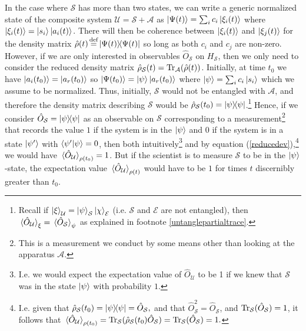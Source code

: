     In the case where $\mathcal{S}$ has more than two states, we can write a generic normalized state of the composite system $\mathcal{U}=\mathcal{S}+\mathcal{A}$  as $\ket{\Psi(t)}=\sum_i c_i\ket{\xi_i(t)}$  where $\ket{\xi_i(t)}=\ket{s_i}\ket{a_i(t)}$. There will then be coherence between $\ket{\xi_i(t)}$ and $\ket{\xi_j(t)}$ for the density matrix $\hat{\rho}(t)\myeq\dyad{\Psi(t)}$ so long as both $c_i$ and $c_j$ are non-zero. However, if we are only interested in observables $\hat{O}_\mathcal{S}$ on $H_\mathcal{S}$, then we only need to consider the reduced density matrix $\hat{\rho}_\mathcal{S}(t)=\operatorname{Tr}_\mathcal{A}(\hat{\rho}(t))$. Initially, at time $t_0$ we have $\ket{a_i(t_0)}=\ket{a_r(t_0)}$ so $\ket{\Psi(t_0)}=\ket{\psi}\ket{a_r(t_0)}$ where $\ket{\psi}=\sum_i c_i\ket{s_i}$ which we assume to be normalized. Thus, initially, $\mathcal{S}$ would not be entangled with $\mathcal{A}$, and therefore the density matrix describing $\mathcal{S}$ would be $\hat{\rho}_\mathcal{S}(t_0)=\dyad{\psi}$.\footnote{Recall if $\ket{\xi}_\mathcal{U}=\ket{\psi}_\mathcal{S}\ket{\chi}_\mathcal{E}$ (i.e. $\mathcal{S}$ and $\mathcal{E}$ are not entangled), then $\ev*{\hat{O}_\mathcal{U}}_\xi=\ev*{\hat{O}_\mathcal{S}}_\psi$ as explained in footnote \ref{untanglepartialtrace}.} Hence, if we consider $\hat{O}_\mathcal{S}=\dyad{\psi}$ as an observable on $\mathcal{S}$ corresponding to a measurement\footnote{This is a measurement we conduct by some means other than looking at the apparatus $\mathcal{A}$.} that records the value $1$ if the system is in the $\ket{\psi}$ and $0$ if the system is in a state $\ket{\psi'}$ with $\ip{\psi'}{\psi}=0$, then both intuitively\footnote{I.e. we would expect the expectation value of $\hat{O}_\mathcal{U}$ to be 1 if we knew that $\mathcal{S}$ was in the state $\ket{\psi}$ with probability $1$. } and by equation (\ref{reducedev}),\footnote{I.e. given that $\hat{\rho}_\mathcal{S}(t_0)=\dyad{\psi}=\hat{O}_\mathcal{S},$ and that $\hat{O}_\mathcal{S}^2= \hat{O}_\mathcal{S}$, and $\operatorname{Tr}_\mathcal{S}(\hat{O}_\mathcal{S}) =1$, it follows that $\ev*{\hat{O}_\mathcal{U}}_{\rho(t_0)}=\Tr_\mathcal{S}(\hat{\rho}_\mathcal{S}(t_0)\hat{O}_\mathcal{S})= \Tr_\mathcal{S}(\hat{O}_\mathcal{S})=1.$} we would have $\ev*{\hat{O}_\mathcal{U}}_{\rho(t_0)}=1$. But if the scientist is to measure $\mathcal{S}$ to be in the $\ket{\psi}$-state, the expectation value $\ev*{\hat{O}_\mathcal{U}}_{\rho(t)}$ would have to be $1$ for times $t$ discernibly greater than $t_0$. 
    
